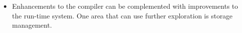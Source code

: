 \begin{itemize}
\item Enhancements to the compiler can be complemented with
improvements to the run-time system. One area that can use further
exploration is storage management.

\end{itemize}

\clearpage
\bigskip
